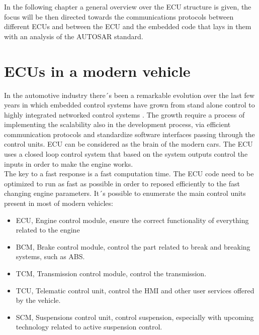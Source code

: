 \documentclass[../main.tex]{subfiles}
\begin{document}
In the following chapter a general overview over the ECU structure is given, the focus will be then directed towards the communications protocols between different ECUs and between the ECU and the embedded code that lays in them with an analysis of the AUTOSAR standard. 
\section{ECUs in a modern vehicle}
In the automotive industry there´s been a remarkable evolution over the last few years in which embedded control systems have grown from stand alone control to highly integrated networked control systems \cite{Johansson_vehicleapplications}. The growth require a process of implementing the scalability also in the development process, via efficient communication protocols and standardize software interfaces passing through the control units. 
ECU can be considered as the brain of the modern cars. The ECU uses a closed loop control system that based on the system outputs control the inputs in order to make the engine works.\\
The key to a fast response is a fast computation time. The ECU code need to be optimized to run as fast as possible in order to reposed efficiently to the fast changing engine parameters. 
It´s possible to enumerate the main control units present in most of modern vehicles:
\begin{itemize}
    \item ECU, Engine control module, ensure the correct functionality of everything related to the engine
    \item BCM, Brake control module, control the part related to break and breaking systems, such as ABS.
    \item TCM, Transmission control module, control the transmission.
    \item TCU, Telematic control unit, control the HMI and other user services offered by the vehicle. 
    \item SCM, Suspensions control unit, control suspension, especially with upcoming technology related to active suspension control. 
\end{itemize}
\end{document}
